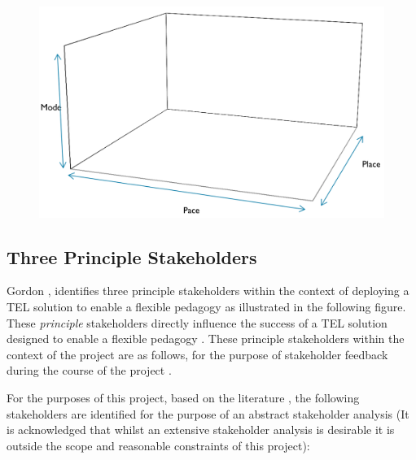 \begin{figure}[H]
	\centering
	\includegraphics[scale=0.4]{figures/flexibleDesign}
	\label{fig:Flexible Pedagogy Design Considerations for TEL}
\end{figure}

\label{sec:sec01}
\subsection{Three Principle Stakeholders}
\label{subsec:subsec01}

Gordon \cite{Gordon2014}, identifies three principle stakeholders within the context of deploying  a TEL solution to enable a flexible pedagogy as illustrated in the following figure. These \textit{principle} stakeholders directly influence the success of a TEL solution designed to enable a flexible pedagogy \cite{Gordon2014}. These principle stakeholders within the context of the project are as follows, for the purpose of stakeholder feedback during the course of the project .

For the purposes of this project, based on the literature \cite{Gordon2014}, the following stakeholders are identified for the purpose of an abstract stakeholder analysis (It is acknowledged that whilst an extensive stakeholder analysis is desirable it is outside the scope and reasonable constraints of this project):

